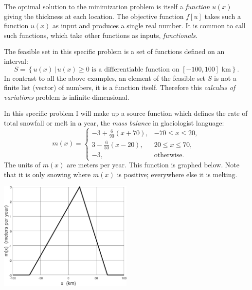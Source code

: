 \documentclass[11pt]{amsart}
\begin{document}
\begin{enumerate}
The optimal solution to the minimization problem is itself a \emph{function} $u(x)$ giving the thickness at each location.  The objective function $f[u]$ takes such a function $u(x)$ as input and produces a single real number.  It is common to call such functions, which take other functions as inputs, \emph{functionals}.

The feasible set in this specific problem is a set of functions defined on an interval:
    $$S = \left\{u(x) \,\big|\, u(x) \ge 0 \text{ is a differentiable function on } [-100,100] \text{ km}\right\}.$$
In contrast to all the above examples, an element of the feasible set $S$ is not a finite list (vector) of numbers, it is a function itself.  Therefore this \emph{calculus of variations} problem is infinite-dimensional.

In this specific problem I will make up a source function which defines the rate of total snowfall or melt in a year, the \emph{mass balance} in glaciologist language:
    $$m(x) = \begin{cases} -3 + \frac{6}{90} (x+70), & -70 \le x \le 20, \\
                            3 - \frac{6}{50} (x-20), & 20 \le x \le 70, \\
                           -3, & \text{otherwise}.
             \end{cases}$$
The units of $m(x)$ are meters per year.  This function is graphed below.  Note that it is only snowing where $m(x)$ is positive; everywhere else it is melting.

\bigskip
\begin{center}
\includegraphics[width=0.5\textwidth]{massbalance}  %
\end{center}



\end{enumerate}
\end{document}
